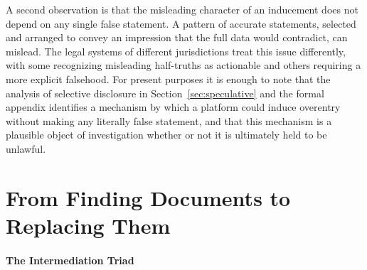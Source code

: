 \documentclass[11pt]{article}
\theoremstyle{remark}
\begin{document}
A second observation is that the misleading character of an inducement does not depend on any single false statement. A pattern of accurate statements, selected and arranged to convey an impression that the full data would contradict, can mislead. The legal systems of different jurisdictions treat this issue differently, with some recognizing misleading half-truths as actionable and others requiring a more explicit falsehood. For present purposes it is enough to note that the analysis of selective disclosure in Section~\ref{sec:speculative} and the formal appendix identifies a mechanism by which a platform could induce overentry without making any literally false statement, and that this mechanism is a plausible object of investigation whether or not it is ultimately held to be unlawful.

\part{From Finding Documents to Replacing Them}

\subsection*{The Intermediation Triad}
\end{document}
